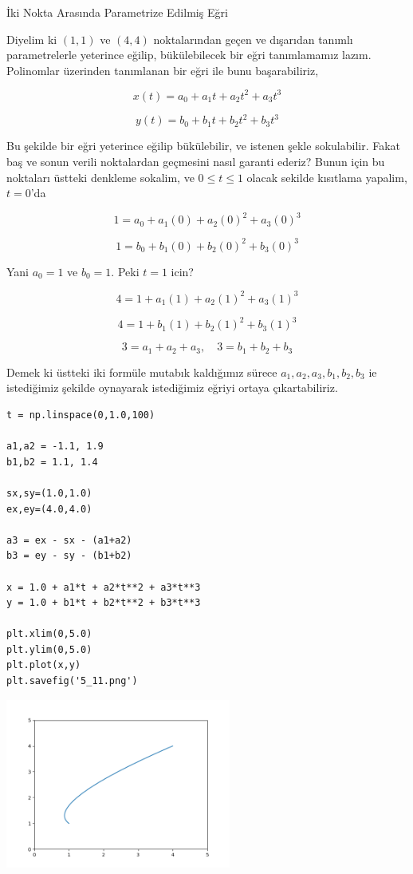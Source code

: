 \documentclass[12pt,fleqn]{article}\usepackage{../../common}
\begin{document}
İki Nokta Arasında Parametrize Edilmiş Eğri

Diyelim ki $(1,1)$ ve $(4,4)$ noktalarından geçen ve dışarıdan tanımlı
parametrelerle yeterince eğilip, bükülebilecek bir eğri tanımlamamız
lazım. Polinomlar üzerinden tanımlanan bir eğri ile bunu başarabiliriz, 

$$
x(t) = a_0 + a_1 t + a_2 t^2 + a_3 t^3
$$

$$
y(t) = b_0 + b_1 t + b_2 t^2 + b_3 t^3
$$

Bu şekilde bir eğri yeterince eğilip bükülebilir, ve istenen şekle
sokulabilir. Fakat baş ve sonun verili noktalardan geçmesini nasıl garanti
ederiz? Bunun için bu noktaları üstteki denkleme sokalim, ve $0 \le t \le
1$ olacak sekilde kısıtlama yapalim, $t=0$'da

$$
1 = a_0 + a_1 (0) + a_2 (0)^2 + a_3 (0)^3
$$

$$
1 = b_0 + b_1 (0) + b_2 (0)^2 + b_3 (0)^3
$$

Yani  $a_0=1$ ve $b_0=1$. Peki $t=1$ icin?

$$
4 = 1 + a_1 (1) + a_2 (1)^2 + a_3 (1)^3 
$$

$$
4 = 1 + b_1 (1) + b_2 (1)^2 + b_3 (1)^3 
$$

$$
3 = a_1 + a_2 + a_3, \quad 3 = b_1 + b_2 + b_3
$$

Demek ki üstteki iki formüle mutabık kaldığımız sürece
$a_1,a_2,a_3,b_1,b_2,b_3$ ie istediğimiz şekilde oynayarak istediğimiz
eğriyi ortaya çıkartabiliriz. 

\begin{verbatim}
t = np.linspace(0,1.0,100)

a1,a2 = -1.1, 1.9
b1,b2 = 1.1, 1.4

sx,sy=(1.0,1.0)
ex,ey=(4.0,4.0)

a3 = ex - sx - (a1+a2)
b3 = ey - sy - (b1+b2)

x = 1.0 + a1*t + a2*t**2 + a3*t**3
y = 1.0 + b1*t + b2*t**2 + b3*t**3

plt.xlim(0,5.0)
plt.ylim(0,5.0)
plt.plot(x,y)
plt.savefig('5_11.png')
\end{verbatim}

\includegraphics[width=20em]{5_11.png}
\end{document}
